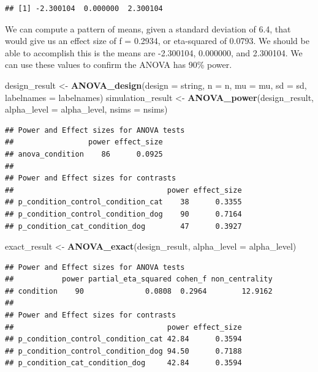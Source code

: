 \documentclass[]{book}
\newenvironment{Shaded}{\begin{snugshade}}{\end{snugshade}}
\newcommand{\DataTypeTok}[1]{\textcolor[rgb]{0.13,0.29,0.53}{#1}}
\newcommand{\KeywordTok}[1]{\textcolor[rgb]{0.13,0.29,0.53}{\textbf{#1}}}
\newcommand{\NormalTok}[1]{#1}
\newcommand{\StringTok}[1]{\textcolor[rgb]{0.31,0.60,0.02}{#1}}
\begin{document}
\begin{verbatim}
## [1] -2.300104  0.000000  2.300104
\end{verbatim}

We can compute a pattern of means, given a standard deviation of 6.4, that would give us an effect size of f = 0.2934, or eta-squared of 0.0793. We should be able to accomplish this is the means are -2.300104, 0.000000, and 2.300104. We can use these values to confirm the ANOVA has 90\% power.

\begin{Shaded}
\begin{Highlighting}[]
\NormalTok{design_result <-}\StringTok{ }\KeywordTok{ANOVA_design}\NormalTok{(}\DataTypeTok{design =}\NormalTok{ string,}
                   \DataTypeTok{n =}\NormalTok{ n, }
                   \DataTypeTok{mu =}\NormalTok{ mu, }
                   \DataTypeTok{sd =}\NormalTok{ sd, }
                   \DataTypeTok{labelnames =}\NormalTok{ labelnames)}
\NormalTok{simulation_result <-}\StringTok{ }\KeywordTok{ANOVA_power}\NormalTok{(design_result, }\DataTypeTok{alpha_level =}\NormalTok{ alpha_level, }\DataTypeTok{nsims =}\NormalTok{ nsims)}
\end{Highlighting}
\end{Shaded}

\begin{verbatim}
## Power and Effect sizes for ANOVA tests
##                 power effect_size
## anova_condition    86      0.0925
## 
## Power and Effect sizes for contrasts
##                                   power effect_size
## p_condition_control_condition_cat    38      0.3355
## p_condition_control_condition_dog    90      0.7164
## p_condition_cat_condition_dog        47      0.3927
\end{verbatim}

\begin{Shaded}
\begin{Highlighting}[]
\NormalTok{exact_result <-}\StringTok{ }\KeywordTok{ANOVA_exact}\NormalTok{(design_result, }\DataTypeTok{alpha_level =}\NormalTok{ alpha_level)}
\end{Highlighting}
\end{Shaded}

\begin{verbatim}
## Power and Effect sizes for ANOVA tests
##           power partial_eta_squared cohen_f non_centrality
## condition    90              0.0808  0.2964        12.9162
## 
## Power and Effect sizes for contrasts
##                                   power effect_size
## p_condition_control_condition_cat 42.84      0.3594
## p_condition_control_condition_dog 94.50      0.7188
## p_condition_cat_condition_dog     42.84      0.3594
\end{verbatim}
\end{document}
